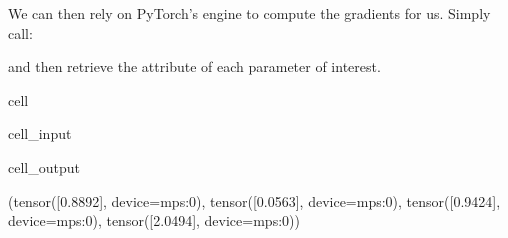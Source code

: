\documentclass[letterpaper,10pt,english]{jupyterBook}
\begin{document}
\sphinxAtStartPar
We can then rely on PyTorch’s  engine to compute the gradients for us. Simply call:

\begin{sphinxVerbatim}[commandchars=\\\{\}]
\end{sphinxVerbatim}

\sphinxAtStartPar
and then retrieve the  attribute of each parameter of interest.

\begin{sphinxuseclass}{cell}\begin{sphinxVerbatimInput}

\begin{sphinxuseclass}{cell_input}
\begin{sphinxVerbatim}[commandchars=\\\{\}]
  
  
  
  


  
  
  
  

   
\end{sphinxVerbatim}

\end{sphinxuseclass}\end{sphinxVerbatimInput}
\begin{sphinxVerbatimOutput}

\begin{sphinxuseclass}{cell_output}
\begin{sphinxVerbatim}[commandchars=\\\{\}]
(tensor([\PYGZhy{}0.8892], device=\PYGZsq{}mps:0\PYGZsq{}),
 tensor([\PYGZhy{}0.0563], device=\PYGZsq{}mps:0\PYGZsq{}),
 tensor([0.9424], device=\PYGZsq{}mps:0\PYGZsq{}),
 tensor([2.0494], device=\PYGZsq{}mps:0\PYGZsq{}))
\end{sphinxVerbatim}

\end{sphinxuseclass}\end{sphinxVerbatimOutput}

\end{sphinxuseclass}
\end{document}

